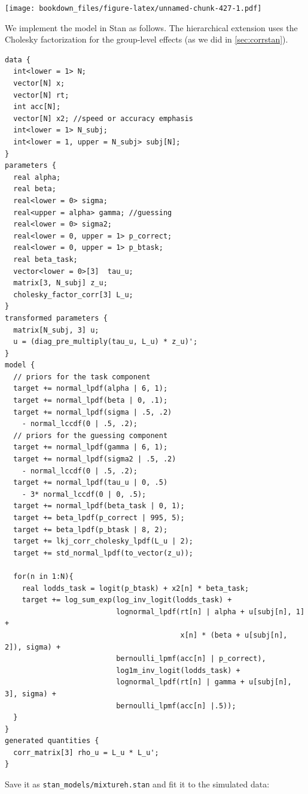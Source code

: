 \documentclass[12pt,]{krantz}
\theoremstyle{definition}
\theoremstyle{definition}
\theoremstyle{definition}
\theoremstyle{remark}
\begin{document}
\texttt{[image: bookdown\_files/figure-latex/unnamed-chunk-427-1.pdf]}

We implement the model in Stan as follows. The hierarchical extension
uses the Cholesky factorization for the group-level effects (as we did
in \ref{sec:corrstan}).

\begin{verbatim}
data {
  int<lower = 1> N;
  vector[N] x;
  vector[N] rt;
  int acc[N];
  vector[N] x2; //speed or accuracy emphasis
  int<lower = 1> N_subj;
  int<lower = 1, upper = N_subj> subj[N];
}
parameters {
  real alpha;
  real beta;
  real<lower = 0> sigma;
  real<upper = alpha> gamma; //guessing
  real<lower = 0> sigma2;
  real<lower = 0, upper = 1> p_correct;
  real<lower = 0, upper = 1> p_btask;
  real beta_task;
  vector<lower = 0>[3]  tau_u;   
  matrix[3, N_subj] z_u;
  cholesky_factor_corr[3] L_u;
}
transformed parameters {
  matrix[N_subj, 3] u;
  u = (diag_pre_multiply(tau_u, L_u) * z_u)';
}
model {
  // priors for the task component
  target += normal_lpdf(alpha | 6, 1);
  target += normal_lpdf(beta | 0, .1);
  target += normal_lpdf(sigma | .5, .2)
    - normal_lccdf(0 | .5, .2);
  // priors for the guessing component
  target += normal_lpdf(gamma | 6, 1);
  target += normal_lpdf(sigma2 | .5, .2)
    - normal_lccdf(0 | .5, .2);
  target += normal_lpdf(tau_u | 0, .5)
    - 3* normal_lccdf(0 | 0, .5);
  target += normal_lpdf(beta_task | 0, 1);
  target += beta_lpdf(p_correct | 995, 5);
  target += beta_lpdf(p_btask | 8, 2);
  target += lkj_corr_cholesky_lpdf(L_u | 2);
  target += std_normal_lpdf(to_vector(z_u));

  for(n in 1:N){
    real lodds_task = logit(p_btask) + x2[n] * beta_task;
    target += log_sum_exp(log_inv_logit(lodds_task) +
                          lognormal_lpdf(rt[n] | alpha + u[subj[n], 1] +
                                         x[n] * (beta + u[subj[n], 2]), sigma) +
                          bernoulli_lpmf(acc[n] | p_correct),
                          log1m_inv_logit(lodds_task) +
                          lognormal_lpdf(rt[n] | gamma + u[subj[n], 3], sigma) +
                          bernoulli_lpmf(acc[n] |.5));
  }
}
generated quantities {
  corr_matrix[3] rho_u = L_u * L_u';
}
\end{verbatim}

Save it as \texttt{stan\_models/mixtureh.stan} and fit it to the
simulated data:
\end{document}
